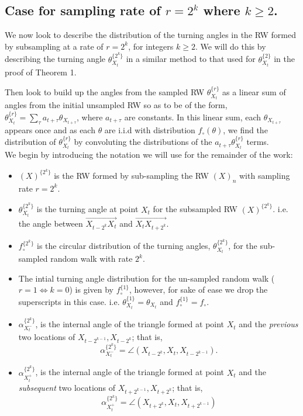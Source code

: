 \documentclass[english]{article}
\begin{document}
\subsection{Case for sampling rate of $r=2^k$ where $k\geq2$.}

We now look to describe the distribution of the turning angles in the RW formed by subsampling at a rate of $r=2^k$, for integers $k\geq2$.  We will do this by describing the turning angle $\theta_{X_t}^{\{2^k\}}$ in a similar method to that used for $\theta_{X_t}^{\{2\}}$ in the proof of Theorem 1.  

Then look to build up the angles from the sampled RW $\theta_{X_t}^{\{r\}}$ as a linear sum of angles from the initial unsampled RW so as to be of the form, $\theta_{X_t}^{\{r\}}=\sum_\tau a_{t+\tau}\theta_{X_{t+\tau}}$, where $a_{t+\tau}$ are constants.  In this linear sum, each $\theta_{X_{t+\tau}}$ appears once and as each $\theta$ are i.i.d with distribution $f_{\circ}(\theta)$, we find the distribution of $\theta_{X_t}^{\{r\}}$ by convoluting the distributions of the $a_{t+\tau}\theta_{X_t}^{\{r\}}$ terms.\\


\noindent We begin by introducing the notation we will use for the remainder of the work:
\begin{itemize}
\item $(X)^{\{2^{k}\}}$ is the RW formed by sub-sampling the RW $(X)_n$ with sampling rate $r=2^{k}$.
\item $\theta^{\{2^k\}}_{X_t}$ is the turning angle at point $X_t$ for the subsampled RW $(X)^{\{2^{k}\}}$. i.e. the angle between $\overrightarrow{X_{t-2^k}X_t}$ and $\overrightarrow{X_tX_{t+2^k}}$.

\item $f_{\circ}^{\{2^{k}\}}$ is the circular distribution of the turning angles, $\theta_{X_t}^{\{2^k\}}$, for the sub-sampled random walk with rate $2^k$.
\item The intial turning angle distribution for the un-sampled random walk ($r=1\Leftrightarrow k=0$) is given by $f_{\circ}^{\{1\}}$, however, for sake of ease we drop the superscripts in this case.  i.e. $\theta_{X_t}^{\{1\}}=\theta_{X_t}$ and $f_{\circ}^{\{1\}}=f_{\circ}$.
\item $\alpha^{\{2^{k}\}}_{X^-_t}$, is the internal angle of the triangle formed at point $X_t$ and the \textit{previous} two locations of $X_{t-2^{k-1}}, X_{t-2^{k}}$; that is, \[\alpha^{\{2^{k}\}}_{X^-_t}=\angle \left(X_{t-2^k},X_t, X_{t-2^{k-1}}\right).\]
\item $\alpha^{\{2^{k}\}}_{X^+_t}$, is the internal angle of the triangle formed at point $X_t$ and the \textit{subsequent} two locations of $X_{t+2^{k-1}}, X_{t+2^{k}}$; that is, \[\alpha^{\{2^{k}\}}_{X^+_t}=\angle \left(X_{t+2^k},X_t, X_{t+2^{k-1}}\right)\]
\end{itemize}
\end{document}

